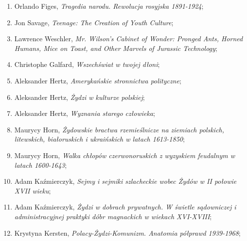 \documentclass[a4paper,11pt]{article}
\begin{document}
\begin{enumerate}
\item Orlando Figes, \textit{Tragedia narodu. Rewolucja rosyjska
    1891-1924};



\item Jon Savage, \textit{Teenage: The Creation of Youth Culture};



\item Lawrence Weschler, \textit{Mr. Wilson's Cabinet of Wonder: Pronged
    Ants, Horned Humans, Mice on Toast, and Other Marvels of Jurassic
    Technology};



\item Christophe Galfard, \textit{Wszechświat w twojej dłoni};



\item Aleksander Hertz, \textit{Amerykańskie stronnictwa polityczne};



\item Aleksander Hertz, \textit{Żydzi w kulturze polskiej};



\item Aleksander Hertz, \textit{Wyznania starego człowieka};



\item Maurycy Horn, \textit{Żydowskie bractwa rzemieślnicze na ziemiach
    polskich, litewskich, białoruskich i ukraińskich w latach
    1613-1850};



\item Maurycy Horn, \textit{Walka chłopów czerwonoruskich z wyzyskiem
    feudalnym w latach 1600-1643};



\item Adam Kaźmierczyk, \textit{Sejmy i sejmiki szlacheckie wobec Żydów
    w II połowie XVII wieku};



\item Adam Kaźmierczyk, \textit{Żydzi w dobrach prywatnych. W świetle
    sądowniczej i administracyjnej praktyki dóbr magnackich w wiekach
    XVI-XVIII};



\item Krystyna Kersten, \textit{Polacy-Żydzi-Komunizm. Anatomia półprawd
    1939-1968};




\end{enumerate}
\end{document}
